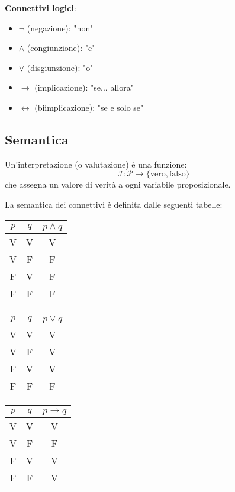 \textbf{Connettivi logici}:
\begin{itemize}
\item $\neg$ (negazione): "non"
\item $\land$ (congiunzione): "e"
\item $\lor$ (disgiunzione): "o"
\item $\rightarrow$ (implicazione): "se... allora"
\item $\leftrightarrow$ (biimplicazione): "se e solo se"
\end{itemize}

\subsection{Semantica}

\begin{definizione}[Interpretazione]
Un'interpretazione (o valutazione) è una funzione:
\begin{equation}
\mathcal{I}: \mathcal{P} \rightarrow \{\text{vero}, \text{falso}\}
\end{equation}
che assegna un valore di verità a ogni variabile proposizionale.
\end{definizione}

\begin{definizione}
La semantica dei connettivi è definita dalle seguenti tabelle:

\begin{center}
\begin{tabular}{cc|c}
$p$ & $q$ & $p \land q$ \\
\hline
V & V & V \\
V & F & F \\
F & V & F \\
F & F & F
\end{tabular}
\quad
\begin{tabular}{cc|c}
$p$ & $q$ & $p \lor q$ \\
\hline
V & V & V \\
V & F & V \\
F & V & V \\
F & F & F
\end{tabular}
\quad
\begin{tabular}{cc|c}
$p$ & $q$ & $p \rightarrow q$ \\
\hline
V & V & V \\
V & F & F \\
F & V & V \\
F & F & V
\end{tabular}
\end{center}
\end{definizione}

